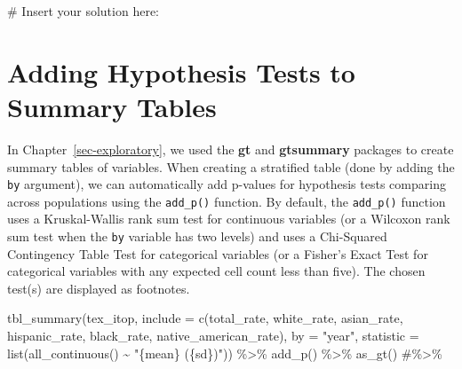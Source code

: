 \documentclass[
  letterpaper,
]{krantz}
\makeatletter
\newenvironment{Shaded}{\begin{snugshade}}{\end{snugshade}}
\newcommand{\AttributeTok}[1]{\textcolor[rgb]{0.40,0.45,0.13}{#1}}
\newcommand{\CommentTok}[1]{\textcolor[rgb]{0.37,0.37,0.37}{#1}}
\newcommand{\FunctionTok}[1]{\textcolor[rgb]{0.28,0.35,0.67}{#1}}
\newcommand{\NormalTok}[1]{\textcolor[rgb]{0.00,0.23,0.31}{#1}}
\newcommand{\SpecialCharTok}[1]{\textcolor[rgb]{0.37,0.37,0.37}{#1}}
\newcommand{\StringTok}[1]{\textcolor[rgb]{0.13,0.47,0.30}{#1}}
\newenvironment{kframe}{%
\medskip{}
\setlength{\fboxsep}{.8em}
 \def\at@end@of@kframe{}%
 \ifinner\ifhmode%
  \def\at@end@of@kframe{\end{minipage}}%
  \begin{minipage}{\columnwidth}%
 \fi\fi%
 \def\FrameCommand##1{\hskip\@totalleftmargin \hskip-\fboxsep
 \colorbox{shadecolor}{##1}\hskip-\fboxsep
     \hskip-\linewidth \hskip-\@totalleftmargin \hskip\columnwidth}%
 \MakeFramed {\advance\hsize-\width
   \@totalleftmargin\z@ \linewidth\hsize
   \@setminipage}}%
 {\par\unskip\endMakeFramed%
 \at@end@of@kframe}
\renewenvironment{Shaded}{\begin{kframe}}{\end{kframe}}
\makeatother
\begin{document}
\begin{Shaded}
\begin{Highlighting}[]
\CommentTok{\# Insert your solution here:}
\end{Highlighting}
\end{Shaded}

\section{Adding Hypothesis Tests to Summary
Tables}\label{adding-hypothesis-tests-to-summary-tables}

In Chapter~\ref{sec-exploratory}, we used the \textbf{gt} and
\textbf{gtsummary} packages to create summary tables of variables. When
creating a stratified table (done by adding the \texttt{by} argument),
we can automatically add p-values for hypothesis tests comparing across
populations using the \texttt{add\_p()} function. By default, the
\texttt{add\_p()} function uses a Kruskal-Wallis rank sum test for
continuous variables (or a Wilcoxon rank sum test when the \texttt{by}
variable has two levels) and uses a Chi-Squared Contingency Table Test
for categorical variables (or a Fisher's Exact Test for categorical
variables with any expected cell count less than five). The chosen
test(s) are displayed as footnotes.

\begin{Shaded}
\begin{Highlighting}[]
\FunctionTok{tbl\_summary}\NormalTok{(tex\_itop, }\AttributeTok{include =} \FunctionTok{c}\NormalTok{(total\_rate, white\_rate, asian\_rate, }
\NormalTok{                                  hispanic\_rate, black\_rate, }
\NormalTok{                                  native\_american\_rate),}
           \AttributeTok{by =} \StringTok{"year"}\NormalTok{, }
           \AttributeTok{statistic =} \FunctionTok{list}\NormalTok{(}\FunctionTok{all\_continuous}\NormalTok{() }\SpecialCharTok{\textasciitilde{}} \StringTok{"\{mean\} (\{sd\})"}\NormalTok{)) }\SpecialCharTok{\%\textgreater{}\%} 
  \FunctionTok{add\_p}\NormalTok{() }\SpecialCharTok{\%\textgreater{}\%}
  \FunctionTok{as\_gt}\NormalTok{() }\CommentTok{\#\%\textgreater{}\% }
\end{Highlighting}
\end{Shaded}
\end{document}
